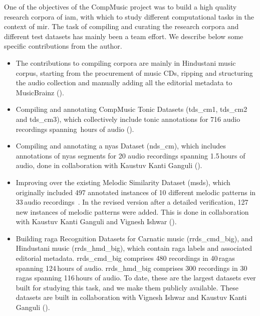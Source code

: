 One of the objectives of the CompMusic project was to build a high quality research corpora of \gls{iam}, with which to study different computational tasks in the context of \gls{mir}. The task of compiling and curating the research corpora and different test datasets has mainly been a team effort. We describe below some specific contributions from the author. 

\begin{itemize}
	
	\item The contributions to compiling corpora are mainly in Hindustani music corpus, starting from the procurement of music CDs, ripping and structuring the audio collection and manually adding all the editorial metadata to MusicBrainz (). 
	
	\item Compiling and annotating CompMusic Tonic Datasets (\acrshort{tds_cm1}, \acrshort{tds_cm2} and \acrshort{tds_cm3}), which collectively include tonic annotations for 716 audio recordings spanning \,hours of audio (). 
	
	\item Compiling and annotating a \Gls{nyas} Dataset (\acrshort{nds_cm}), which includes annotations of \gls{nyas} segments for 20 audio recordings spanning 1.5\,hours of audio, done in collaboration with Kaustuv Kanti Ganguli (). 
	
	\item Improving over the existing Melodic Similarity Dataset (\acrshort{msds}), which originally included 497 annotated instances of 10 different melodic patterns in 33\,audio recordings~\citep{}. In the revised version after a detailed verification, 127\,new instances of melodic patterns were added. This is done in collaboration with Kaustuv Kanti Ganguli and Vignesh Ishwar ().
	
	\item Building \Gls{raga} Recognition Datasets for Carnatic music (\acrshort{rrds_cmd_big}), and Hindustani music (\acrshort{rrds_hmd_big}), which contain \gls{raga} labels and associated editorial metadata. \acrshort{rrds_cmd_big} comprises 480 recordings in 40\,\glspl{raga} spanning 124\,hours of audio. \acrshort{rrds_hmd_big} comprises 300 recordings in 30\,\glspl{raga} spanning 116\,hours of audio. To date, these are the largest datasets ever built for studying this task, and we make them publicly available. These datasets are built in collaboration with Vignesh Ishwar and Kaustuv Kanti Ganguli ().
	
\end{itemize}


